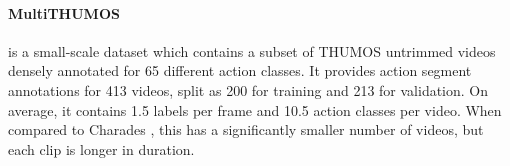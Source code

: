 \documentclass[letterpaper]{article} \usepackage{aaai23}  \usepackage{times}  \usepackage{helvet}  \usepackage{courier}  \usepackage[hyphens]{url}  \usepackage{graphicx} \urlstyle{rm} \def\UrlFont{\rm}  \usepackage{natbib}  \usepackage{caption} \frenchspacing  \setlength{\pdfpagewidth}{8.5in}  \setlength{\pdfpageheight}{11in}  \usepackage{algorithm}
\begin{document}
\paragraph{MultiTHUMOS} \cite{yeung2018every} is a small-scale dataset which contains a subset of THUMOS \cite{jiang2014thumos} untrimmed videos densely annotated for 65 different action classes. It provides action segment annotations for 413 videos, split as 200 for training and 213 for validation. On average, it contains 1.5 labels per frame and 10.5 action classes per video. When compared to Charades \cite{sigurdsson2016hollywood}, this has a significantly smaller number of videos, but each clip is longer in duration.


\end{document}
